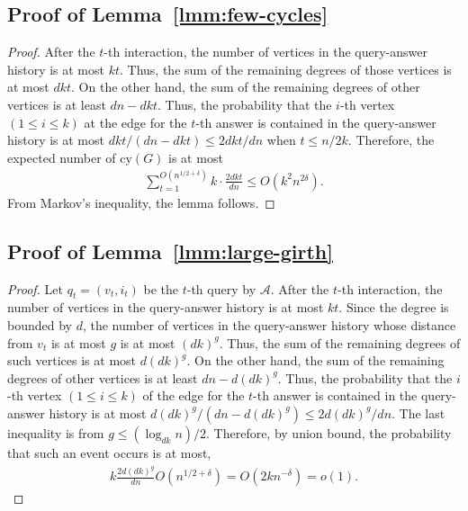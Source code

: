 \documentclass[letterpaper,11pt]{article}
\newcommand{\cy}{\mathrm{cy}}
\newcommand{\cala}{\mathcal{A}}
\begin{document}
\subsection{Proof of Lemma~\ref{lmm:few-cycles}}\label{apx:few-cycles}
\begin{proof}
  After the $t$-th interaction,
  the number of vertices in the query-answer history is at most $kt$.
  Thus, the sum of the remaining degrees of those vertices is at most $dkt$.
  On the other hand, the sum of the remaining degrees of other vertices is at least $dn-dkt$.
  Thus, the probability that the $i$-th vertex $(1\leq i \leq k)$ at the edge for the $t$-th answer is contained in the query-answer history is at most $dkt/(dn-dkt) \leq 2dkt/dn$ when $t\leq n/2k$.
  Therefore, the expected number of $\cy(G)$ is at most 
  \begin{eqnarray*}
    \sum_{t=1}^{O(n^{1/2+\delta})}k\cdot \frac{2dkt}{dn} \leq O(k^2n^{2\delta}).
  \end{eqnarray*}
  From Markov's inequality, the lemma follows.
\end{proof}
\subsection{Proof of Lemma~\ref{lmm:large-girth}}\label{apx:large-girth}
\begin{proof}
  Let $q_t=(v_t,i_t)$ be the $t$-th query by $\cala$.
  After the $t$-th interaction,
  the number of vertices in the query-answer history is at most $kt$.
  Since the degree is bounded by $d$,
  the number of vertices in the query-answer history whose distance from $v_t$ is at most $g$ is at most $(dk)^g$.
  Thus, the sum of the remaining degrees of such vertices is at most $d(dk)^g$.
  On the other hand, the sum of the remaining degrees of other vertices is at least $dn-d(dk)^g$.
  Thus, the probability that the $i$-th vertex $(1\leq i \leq k)$ of the edge for the $t$-th answer is contained in the query-answer history is at most $d(dk)^g/(dn-d(dk)^g) \leq 2d(dk)^g/dn$.
  The last inequality is from $g\leq (\log_{dk}n)/2$.
  Therefore, by union bound, the probability that such an event occurs is at most,
  \begin{eqnarray*}
    k \frac{2d(dk)^g}{dn}O(n^{1/2+\delta})=O(2kn^{-\delta})=o(1).
  \end{eqnarray*}
\end{proof}
\end{document}
